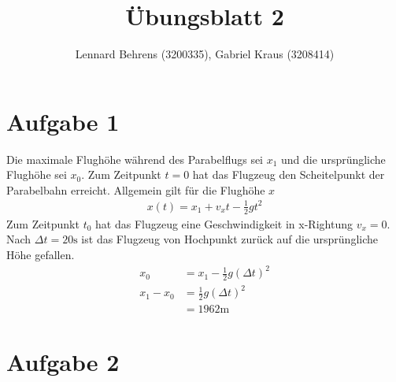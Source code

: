 \documentclass[a4paper,11pt]{article}
\title{Übungsblatt 2}
\author{Lennard Behrens (3200335), Gabriel Kraus (3208414)}
\begin{document}
\maketitle

\section*{Aufgabe 1}
Die maximale Flughöhe während des Parabelflugs sei $x_1$ und die ursprüngliche Flughöhe sei $x_0$. Zum Zeitpunkt $t=0$ hat das Flugzeug den Scheitelpunkt der Parabelbahn erreicht. Allgemein gilt für die Flughöhe $x$
\begin{align*}
  x(t) = x_1 + v_xt- \frac{1}{2} g t^2
\end{align*} 
Zum Zeitpunkt $t_0$ hat das Flugzeug eine Geschwindigkeit in x-Rightung $v_x=0$. Nach $\Delta t = 20 \mbox{s}$ ist das Flugzeug von Hochpunkt zurück auf die ursprüngliche Höhe gefallen. 
\begin{align*}
  x_0 &= x_1 - \frac{1}{2} g (\Delta t)^2 \\
  x_1 - x_0 &= \frac{1}{2} g (\Delta t)^2 \\
  &= 1962 \mbox{m}
\end{align*}

\section*{Aufgabe 2}
\end{document}
